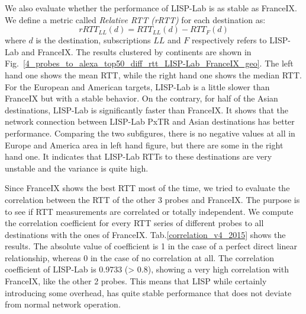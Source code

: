 We also evaluate whether the performance of LISP-Lab is as stable as FranceIX. %
We define a metric called \emph{Relative RTT (rRTT)} for each destination as: 
\begin{equation} 
    \label{rRTT_ll_2015}
    rRTT_{LL}(d)=RTT_{LL}(d) - RTT_{F}(d)
\end{equation}
where $d$ is the destination, subscriptions $LL$ and $F$ respectively refers to LISP-Lab and FranceIX. The results clustered by continents are shown in Fig.~\ref{4_probes_to_alexa_top50_diff_rtt_LISP-Lab_FranceIX_geo}. The left hand one shows the mean RTT, while the right hand one shows the median RTT. For the European and American targets, LISP-Lab is a little slower than FranceIX but with a stable behavior. On the contrary, for half of the Asian destinations, LISP-Lab is significantly faster than FranceIX. It shows that the network connection between LISP-Lab PxTR and Asian destinations has better performance. Comparing the two subfigures, there is no negative values at all in Europe and America area in left hand figure, but there are some in the right hand one. It indicates that LISP-Lab RTTs to these destinations are very unstable and the variance is quite high.

\begin{table}[!tb]
	\centering
	\caption{Correlation coefficient to FranceIX from Dataset 2015}
	\label{correlation_v4_2015}{
		}
\end{table}

Since FranceIX shows the best RTT most of the time, we tried to evaluate the correlation between the RTT of the other 3 probes and FranceIX. The purpose is to see if RTT measurements are correlated or totally independent. We compute the correlation coefficient for every RTT series of different probes to all destinations with the ones of FranceIX. Tab.\ref{correlation_v4_2015} shows the results. The absolute value of coefficient is 1 in the case of a perfect direct linear relationship, whereas 0 in the case of no correlation at all. The correlation coefficient of LISP-Lab is 0.9733 (> 0.8), showing a very high correlation with FranceIX, like the other 2 probes. This means that LISP while certainly introducing some overhead, has quite stable performance that does not deviate from normal network operation.


